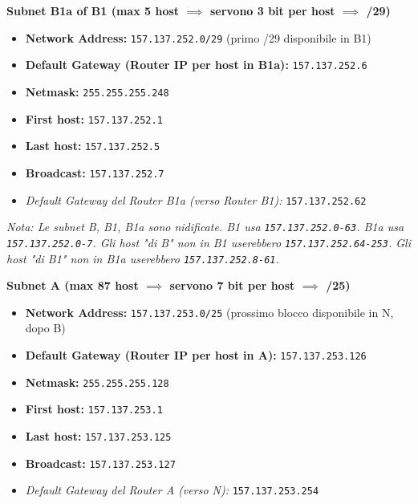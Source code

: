 \documentclass[12pt,a4paper]{article}
\newcommand{\TT}[1]{\texttt{#1}}
\begin{document}
\begin{enumerate}[label=\textbf{\arabic*.}, wide, labelindent=0pt, leftmargin=*]
    \textbf{Subnet B1a of B1 (max 5 host $\implies$ servono 3 bit per host $\implies$ /29)}
    \begin{itemize}[label=\textbullet]
        \item \textbf{Network Address:} \TT{157.137.252.0/29} (primo /29 disponibile in B1)
        \item \textbf{Default Gateway (Router IP per host in B1a):} \TT{157.137.252.6}
        \item \textbf{Netmask:} \TT{255.255.255.248}
        \item \textbf{First host:} \TT{157.137.252.1}
        \item \textbf{Last host:} \TT{157.137.252.5}
        \item \textbf{Broadcast:} \TT{157.137.252.7}
        \item \textit{Default Gateway del Router B1a (verso Router B1):} \TT{157.137.252.62}
    \end{itemize}
    \textit{Nota: Le subnet B, B1, B1a sono nidificate. B1 usa \TT{157.137.252.0-63}. B1a usa \TT{157.137.252.0-7}. Gli host "di B" non in B1 userebbero \TT{157.137.252.64-253}. Gli host "di B1" non in B1a userebbero \TT{157.137.252.8-61}.}


    \textbf{Subnet A (max 87 host $\implies$ servono 7 bit per host $\implies$ /25)}
    \begin{itemize}[label=\textbullet]
        \item \textbf{Network Address:} \TT{157.137.253.0/25} (prossimo blocco disponibile in N, dopo B)
        \item \textbf{Default Gateway (Router IP per host in A):} \TT{157.137.253.126}
        \item \textbf{Netmask:} \TT{255.255.255.128}
        \item \textbf{First host:} \TT{157.137.253.1}
        \item \textbf{Last host:} \TT{157.137.253.125}
        \item \textbf{Broadcast:} \TT{157.137.253.127}
        \item \textit{Default Gateway del Router A (verso N):} \TT{157.137.253.254}
    \end{itemize}


\end{enumerate}
\end{document}
